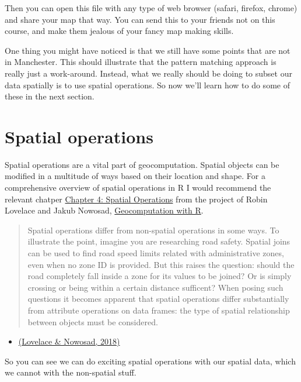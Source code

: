 \documentclass[]{book}
\providecommand{\tightlist}{%
  \setlength{\itemsep}{0pt}\setlength{\parskip}{0pt}}
\begin{document}
Then you can open this file with any type of web browser (safari, firefox, chrome) and share your map that way. You can send this to your friends not on this course, and make them jealous of your fancy map making skills.

One thing you might have noticed is that we still have some points that are not in Manchester. This should illustrate that the pattern matching approach is really just a work-around. Instead, what we really should be doing to subset our data spatially is to use spatial operations. So now we'll learn how to do some of these in the next section.

\hypertarget{spatial-operations}{%
\section{Spatial operations}\label{spatial-operations}}

Spatial operations are a vital part of geocomputation. Spatial objects can be modified in a multitude of ways based on their location and shape. For a comprehensive overview of spatial operations in R I would recommend the relevant chatper \href{https://geocompr.robinlovelace.net/spatial-operations.html}{Chapter 4: Spatial Operations} from the project of Robin Lovelace and Jakub Nowosad, \href{https://geocompr.robinlovelace.net/spatial-operations.html}{Geocomputation with R}.

\begin{quote}
Spatial operations differ from non-spatial operations in some ways. To illustrate the point, imagine you are researching road safety. Spatial joins can be used to find road speed limits related with administrative zones, even when no zone ID is provided. But this raises the question: should the road completely fall inside a zone for its values to be joined? Or is simply crossing or being within a certain distance sufficent? When posing such questions it becomes apparent that spatial operations differ substantially from attribute operations on data frames: the type of spatial relationship between objects must be considered.
\end{quote}

\begin{itemize}
\tightlist
\item
  \href{https://geocompr.robinlovelace.net/spatial-operations.html}{(Lovelace \& Nowosad, 2018)}
\end{itemize}

So you can see we can do exciting spatial operations with our spatial data, which we cannot with the non-spatial stuff.
\end{document}
